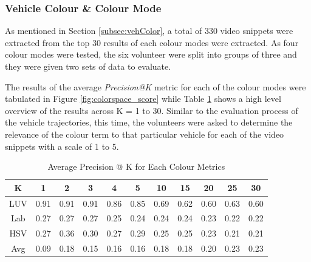\subsubsection{Vehicle Colour \& Colour Mode}

As mentioned in Section \ref{subsec:vehColor}, a total of 330 video snippets were extracted from the top 30 results of each colour modes were extracted. As four colour modes were tested, the six volunteer were split into groups of three and they were given two sets of data to evaluate. 

The results of the average \textit{Precision@K} metric for each of the colour modes were tabulated in Figure \ref{fig:colorspace_score} while Table \ref{tab:avg@k} shows a high level overview of the results across K = 1 to 30. Similar to the evaluation process of the vehicle trajectories, this time, the volunteers were asked to determine the relevance of the colour term to that particular vehicle for each of the video snippets with a scale of 1 to 5. 

\begin{table}[!t]
	\centering
	\caption{Average Precision @ K for Each Colour Metrics}
	\label{tab:avg@k}
\begin{tabular}{c||c|c|c|c|c|c|c|c|c|c}
K & 1 & 2 & 3 & 4 & 5 & 10 & 15 & 20 & 25 & 30  \\ \hline \hline 
\rowcolor{yellow} LUV  & 0.91 & 0.91 & 0.91 & 0.86 & 0.85 & 0.69 & 0.62 & 0.60 & 0.63 & 0.60 \\ 
Lab  & 0.27 & 0.27 & 0.27 & 0.25 & 0.24 & 0.24 & 0.24 & 0.23 & 0.22 & 0.22 \\ 
HSV & 0.27 & 0.36 & 0.30 & 0.27 & 0.29 & 0.25 & 0.25 & 0.23 & 0.21 & 0.21 \\  
Avg & 0.09 & 0.18 & 0.15 & 0.16 & 0.16 & 0.18 & 0.18 & 0.20 & 0.23 & 0.23 \\ 
\end{tabular} 
\end{table}


